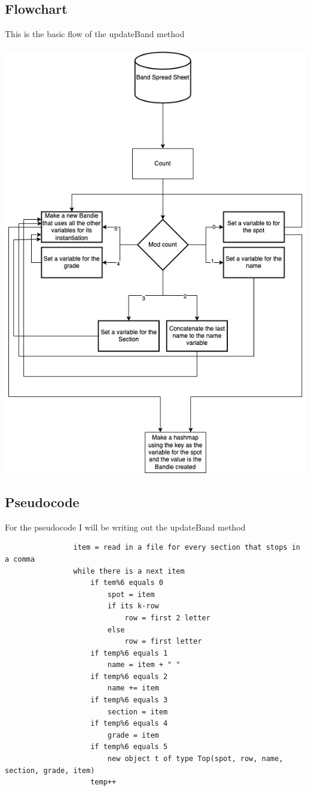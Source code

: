 \documentclass{article}
\begin{document}
		\subsection{Flowchart}
			This is the basic flow of the updateBand method \\ \\
			\includegraphics[width=6in]{IA UML and Flowchart-Flowchart.jpg}
		\subsection{Pseudocode}
			For the pseudocode I will be writing out the updateBand method
			\begin{verbatim}
				item = read in a file for every section that stops in a comma
				while there is a next item
					if tem%6 equals 0 
						spot = item
						if its k-row
							row = first 2 letter
						else
							row = first letter
					if temp%6 equals 1
						name = item + " "
					if temp%6 equals 2
						name += item
					if temp%6 equals 3
						section = item
					if temp%6 equals 4
						grade = item
					if temp%6 equals 5
						new object t of type Top(spot, row, name, section, grade, item)
					temp++
			\end{verbatim}
\end{document}

